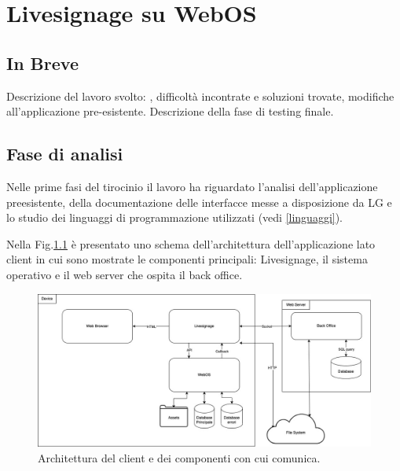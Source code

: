\chapter{Livesignage su WebOS}\label{svolgimento}
\section{In Breve}
Descrizione del lavoro svolto: , difficoltà incontrate e soluzioni trovate, modifiche all'applicazione pre-esistente. Descrizione della fase di testing finale.

\section{Fase di analisi}

Nelle prime fasi del tirocinio il lavoro ha riguardato l'analisi dell'applicazione preesistente, della documentazione delle interfacce messe a disposizione da LG e lo studio dei linguaggi di programmazione utilizzati (vedi \ref*{linguaggi}).

Nella Fig.\ref*{fig:architettura_2} è presentato uno schema dell'architettura dell'applicazione lato client  in cui sono mostrate le componenti principali: Livesignage, il sistema operativo e il web server che ospita il back office. 

\begin{figure}[!htb]
    \centering
    \includegraphics[width= 1\textwidth]{images/svolgimento/webos_client_archi.jpg} 
    \caption{Architettura del client e dei componenti con cui comunica.} 
    \label{fig:architettura_2}
\end{figure}

